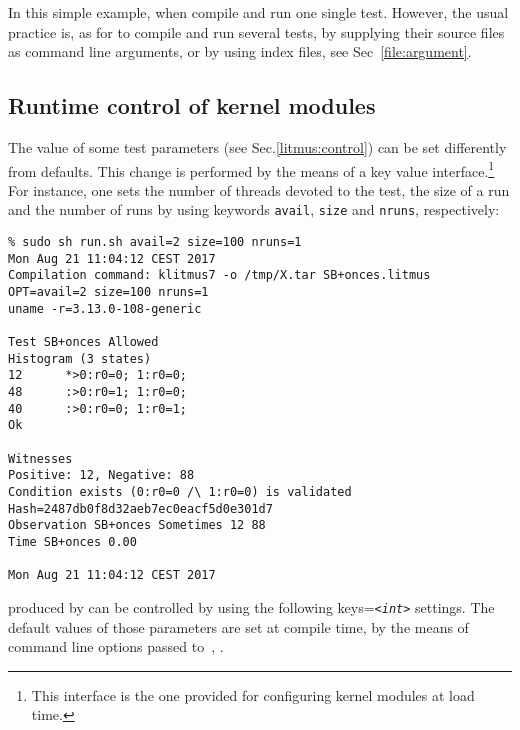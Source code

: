 In this simple example, when compile and run one single test.
However, the usual practice is, as for \litmus{} to compile and run
several tests, by supplying their source files as command line arguments,
or by using index files, see Sec~\ref{file:argument}.

\subsection{Runtime control of kernel modules}
The value of some test parameters
(see Sec.\ref{litmus:control}) can be set differently from defaults.
This change is performed by the means
of a key value interface.\footnote{This interface is the one provided for
configuring kernel modules at load time.}
For instance, one sets the number of threads devoted
to the test, the size of a run
and the number of runs by using keywords \texttt{avail},
\texttt{size} and \texttt{nruns}, respectively:
\begin{verbatim}
% sudo sh run.sh avail=2 size=100 nruns=1
Mon Aug 21 11:04:12 CEST 2017
Compilation command: klitmus7 -o /tmp/X.tar SB+onces.litmus
OPT=avail=2 size=100 nruns=1
uname -r=3.13.0-108-generic

Test SB+onces Allowed
Histogram (3 states)
12      *>0:r0=0; 1:r0=0;
48      :>0:r0=1; 1:r0=0;
40      :>0:r0=0; 1:r0=1;
Ok

Witnesses
Positive: 12, Negative: 88
Condition exists (0:r0=0 /\ 1:r0=0) is validated
Hash=2487db0f8d32aeb7ec0eacf5d0e301d7
Observation SB+onces Sometimes 12 88
Time SB+onces 0.00

Mon Aug 21 11:04:12 CEST 2017
\end{verbatim}

produced by \klitmus{} can be controlled by
using the following keys=\texttt{\em{<int>}} settings.
The default values of those parameters are set at compile time,
by the means of command line options passed to~\klitmus,
.

